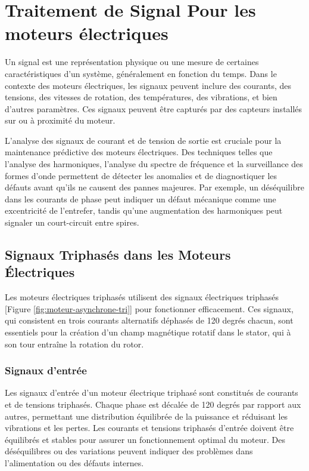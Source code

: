 
\section{Traitement de Signal Pour les moteurs électriques}

Un signal est une représentation physique ou une mesure de certaines
caractéristiques d’un système, généralement en fonction du temps. Dans le
contexte des moteurs électriques, les signaux peuvent inclure des courants, des
tensions, des vitesses de rotation, des températures, des vibrations, et bien
d'autres paramètres. Ces signaux peuvent être capturés par des capteurs
installés sur ou à proximité du moteur.

L'analyse des signaux de courant et de tension de sortie est cruciale pour la
maintenance prédictive des moteurs électriques. Des techniques telles que
l'analyse des harmoniques, l'analyse du spectre de fréquence et la surveillance
des formes d'onde permettent de détecter les anomalies et de diagnostiquer les
défauts avant qu'ils ne causent des pannes majeures. Par exemple, un
déséquilibre dans les courants de phase peut indiquer un défaut mécanique comme
une excentricité de l'entrefer, tandis qu'une augmentation des harmoniques peut
signaler un court-circuit entre spires.

\subsection*{Signaux Triphasés dans les Moteurs Électriques}

Les moteurs électriques triphasés utilisent des signaux électriques triphasés
[Figure \ref{fig:moteur-asynchrone-tri}] pour fonctionner efficacement. Ces
signaux, qui consistent en trois courants alternatifs déphasés de 120 degrés
chacun, sont essentiels pour la création d'un champ magnétique rotatif dans le
stator, qui à son tour entraîne la rotation du rotor.

\subsubsection*{Signaux d'entrée}

Les signaux d'entrée d'un moteur électrique triphasé sont constitués de
courants et de tensions triphasés. Chaque phase est décalée de 120 degrés par
rapport aux autres, permettant une distribution équilibrée de la puissance et
réduisant les vibrations et les pertes. Les courants et tensions triphasés
d'entrée doivent être équilibrés et stables pour assurer un fonctionnement
optimal du moteur. Des déséquilibres ou des variations peuvent indiquer des
problèmes dans l'alimentation ou des défauts internes.


